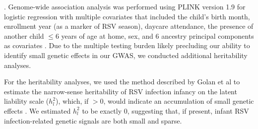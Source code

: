 \documentclass{article} %
\begin{document}
\citep{yang2011gcta}.
Genome-wide association analysis was performed using PLINK version 1.9 for logistic regression with multiple covariates that included the child's birth month, enrollment year (as a marker of RSV season), daycare attendance, the presence of another child $\le 6$ years of age at home, sex, and 6 ancestry principal components as covariates
\citep{purcell2007plink}.
Due to the multiple testing burden likely precluding our ability to identify small genetic effects in our GWAS, we conducted additional heritability analyses.

For the heritability analyses, we used the method described by Golan et al to estimate the narrow-sense heritability of RSV infection infancy on the latent liability scale ($h_l^2$), which, if  $> 0$, would indicate an accumulation of small genetic effects
\citep{golan2014measuring}.
We estimated $h_l^2$ to be exactly 0, suggesting that, if present, infant RSV infection-related genetic signals are both small and sparse. 
\end{document}

